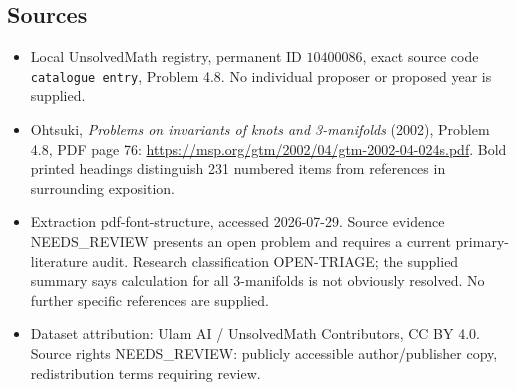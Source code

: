 \documentclass[11pt]{article}
\begin{document}
\subsection{Sources}
\begin{itemize}
\item Local UnsolvedMath registry, permanent ID \(10400086\), exact source code \texttt{catalogue entry}, Problem 4.8. No individual proposer or proposed year is supplied.
\item Ohtsuki, \emph{Problems on invariants of knots and 3-manifolds} (2002), Problem 4.8, PDF page 76: \url{https://msp.org/gtm/2002/04/gtm-2002-04-024s.pdf}. Bold printed headings distinguish 231 numbered items from references in surrounding exposition.
\item Extraction pdf-font-structure, accessed 2026-07-29. Source evidence NEEDS\_REVIEW presents an open problem and requires a current primary-literature audit. Research classification OPEN-TRIAGE; the supplied summary says calculation for all \(3\)-manifolds is not obviously resolved. No further specific references are supplied.
\item Dataset attribution: Ulam AI / UnsolvedMath Contributors, CC BY 4.0. Source rights NEEDS\_REVIEW: publicly accessible author/publisher copy, redistribution terms requiring review.
\end{itemize}
\end{document}
